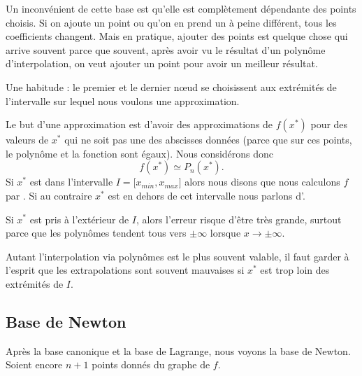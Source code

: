 Un inconvénient de cette base est qu'elle est complètement dépendante des points choisis. Si on ajoute un point ou qu'on en prend un à peine différent, tous les coefficients changent. Mais en pratique, ajouter des points est quelque chose qui arrive souvent parce que souvent, après avoir vu le résultat d'un polynôme d'interpolation, on veut ajouter un point pour avoir un meilleur résultat.

\begin{normaltext}
    Une habitude : le premier et le dernier nœud se choisissent aux extrémités de l'intervalle sur lequel nous voulons une approximation.

    Le but d'une approximation est d'avoir des approximations de \( f(x^*)\) pour des valeurs de \( x^*\) qui ne soit pas une des abscisses données (parce que sur ces points, le polynôme et la fonction sont égaux). Nous considérons donc
    \begin{equation}
        f(x^*)\simeq P_n(x^*).
    \end{equation}
    Si \( x^*\) est dans l'intervalle \( I= \mathopen[ x_{min} , x_{max} \mathclose]\) alors nous disons que nous calculons \( f\) par . Si au contraire \( x^*\) est en dehors de cet intervalle nous parlons d'.

    Si \( x^*\) est pris à l'extérieur de \( I\), alors l'erreur risque d'être très grande, surtout parce que les polynômes tendent tous vers \( \pm\infty\) lorsque \( x\to \pm\infty\).

    Autant l'interpolation via polynômes est le plus souvent valable, il faut garder à l'esprit que les extrapolations sont souvent mauvaises si \( x^*\) est trop loin des extrémités de \( I\).
\end{normaltext}

\subsection{Base de Newton}

Après la base canonique et la base de Lagrange, nous voyons la base de Newton. Soient encore \( n+1\) points donnés du graphe de \( f\).

